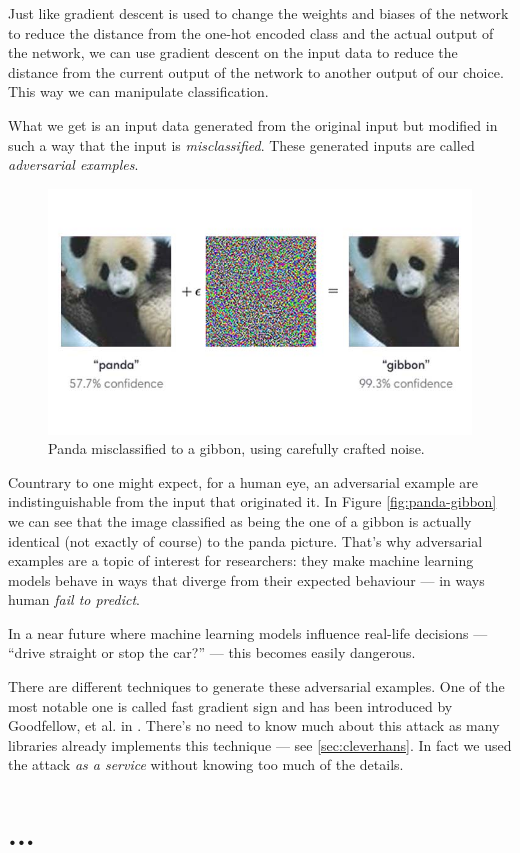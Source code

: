 Just like gradient descent is used to change the weights and biases of
the network to reduce the distance from the one-hot encoded class and
the actual output of the network, we can use gradient descent on the
input data to reduce the distance from the current output of the network to
another output of our choice. This way we can manipulate classification.

What we get is an input data generated from the original input but
modified in such a way that the input is \emph{misclassified}. These
generated inputs are called \emph{adversarial examples}.

\begin{figure}
  \centering
  \includegraphics[width=0.5\linewidth]{panda-gibbon.jpg}
  \caption{Panda misclassified to a gibbon, using carefully crafted
    noise.}
\end{figure}

Countrary to one might expect, for a human eye, an adversarial example
are indistinguishable from the input that originated it. In Figure
\ref{fig:panda-gibbon} we can see that the image classified as being
the one of a gibbon is actually identical (not exactly of course) to
the panda picture. That's why adversarial examples are a topic of
interest for researchers: they make machine learning models behave in
ways that diverge from their expected behaviour --- in ways human
\emph{fail to predict}.

In a near future where machine learning models influence real-life
decisions --- ``drive straight or stop the car?'' --- this becomes
easily dangerous.

There are different techniques to generate these adversarial examples.
One of the most notable one is called fast gradient sign and has been
introduced by Goodfellow, et al. in \cite{goodfellow6572explaining}.
There's no need to know much about this attack as many libraries
already implements this technique --- see \ref{sec:cleverhans}. In fact
we used the attack \emph{as a service} without knowing too much of the
details.

\section{...}

